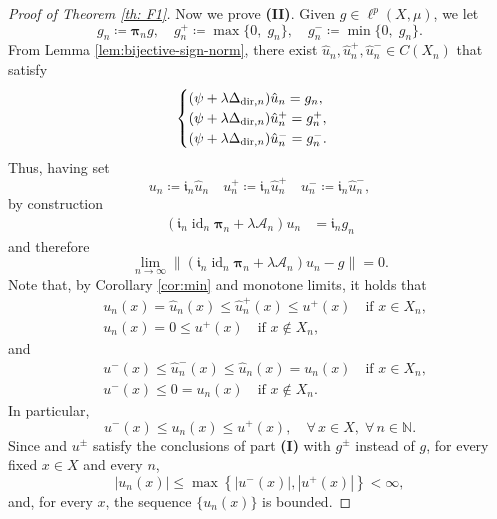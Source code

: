 \documentclass[journal]{article}
\theoremstyle{nonitalic}
\theoremstyle{nonitalic}
\theoremstyle{plain} %
\numberwithin{equation}{section}
\newcommand{\N}{\mathbb{N}}
\begin{document}
\begin{proof}[Proof of Theorem \ref{th: F1}]
Now we prove \textnormal{\textbf{(II)}}. Given $g\in \ell^p(X,\mu)$, we let
\begin{equation}\label{pm}
	g_n \coloneqq \boldsymbol{\pi}_{n}g,\quad
	g^+_n\coloneqq \max\{0, \; g_n \},\quad
	g^-_n\coloneqq \min\{0, \; g_n \}.
\end{equation} 
From Lemma \ref{lem:bijective-sign-norm}, there exist $\hat{u}_{n}, \hat{u}^+_{n}, \hat{u}^-_{n}\in C(X_n)$ that satisfy
\begin{equation}\label{eq:Laccretive}
	\begin{cases}
		(\psi + \lambda\Delta_{\textnormal{dir},n})\hat{u}_{n} = g_n,\\
		(\psi +\lambda\Delta_{\textnormal{dir},n})\hat{u}^+_{n}  = g^+_n,\\
		(\psi +\lambda\Delta_{\textnormal{dir},n})\hat{u}^-_{n}  = g^-_n.
	\end{cases}
\end{equation}
Thus, having set
\begin{equation}\label{eq:def_u_n}
 u_n \coloneqq \mathbf{\mathfrak{i}}_{n}\hat{u}_n\quad  u_n^+ \coloneqq \mathbf{\mathfrak{i}}_{n}\hat{u}_n^+\quad  u_n^- \coloneqq \mathbf{\mathfrak{i}}_{n}\hat{u}_n^-,
\end{equation}
by construction
\begin{align*}
(\boldsymbol{\mathfrak{i}}_{n}\operatorname{id}_n\boldsymbol{\pi}_{n}   + \lambda \mathcal A_n )u_n 
	&= \boldsymbol{\mathfrak{i}}_{n}  g_n
\end{align*}
and therefore
$$
\lim_{n\to \infty}\|\left(\boldsymbol{\mathfrak{i}}_{n}\operatorname{id}_n\boldsymbol{\pi}_{n} + \lambda \mathcal A_n\right) u_n- g\|=0.
$$
Note that, by  
Corollary \ref{cor:min} and monotone limits, it holds that
\begin{align*}
	& u_n(x) = \hat{u}_n(x)\leq  \hat{u}^+_n(x)\leq u^+(x) \quad \mbox{if } x\in X_n,\\
	& u_n(x) = 0\leq u^+(x) \quad \mbox{if } x\notin X_n,
\end{align*}
and
\begin{align*}
	&  u^-(x)\leq \hat{u}^-_n(x)\leq \hat{u}_n(x)=u_n(x)    \quad \mbox{if } x\in X_n,\\
	& u^-(x)\leq 0= u_n(x) \quad \mbox{if } x\notin X_n.
\end{align*}
In particular, 
$$
u^-(x)\leq  u_n(x)\leq  u^+(x), \quad \forall\, x\in X,\;\forall\, n\in \N.
$$
Since and $u^\pm$ satisfy the conclusions of part \textnormal{\textbf{(I)}} with $g^{\pm}$ instead of $g$,  
  for every fixed $x\in X$ and every $n$, 
\begin{equation}\label{eq:uniform_bound}
	|u_n(x)| \leq %
    \max\left\{|u^-(x)|, |u^+(x)|\right\}<\infty, 
\end{equation}
and, for every $x$, the sequence $\{u_n(x)\}$ is  
bounded. 


\end{proof}
\end{document}
